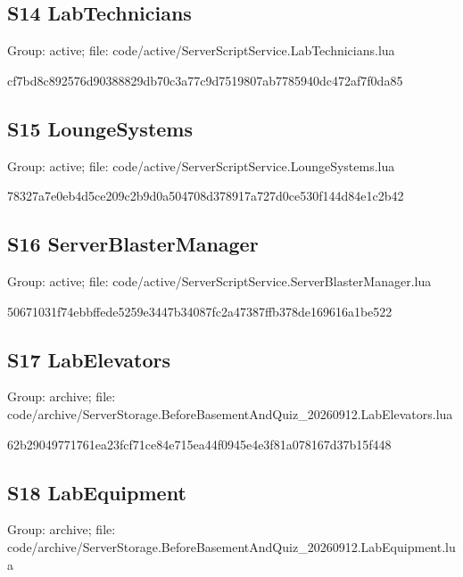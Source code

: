 \subsection{S14 LabTechnicians}
Group: active; file: code/\allowbreak{}active/\allowbreak{}ServerScriptService.\allowbreak{}LabTechnicians.\allowbreak{}lua

\begin{flushleft}\ttfamily\footnotesize cf7bd8c892576d90388829db70c3a77c9d7519807ab7785940dc472af7f0da85\end{flushleft}
\subsection{S15 LoungeSystems}
Group: active; file: code/\allowbreak{}active/\allowbreak{}ServerScriptService.\allowbreak{}LoungeSystems.\allowbreak{}lua

\begin{flushleft}\ttfamily\footnotesize 78327a7e0eb4d5ce209c2b9d0a504708d378917a727d0ce530f144d84e1c2b42\end{flushleft}
\subsection{S16 ServerBlasterManager}
Group: active; file: code/\allowbreak{}active/\allowbreak{}ServerScriptService.\allowbreak{}ServerBlasterManager.\allowbreak{}lua

\begin{flushleft}\ttfamily\footnotesize 50671031f74ebbffede5259e3447b34087fc2a47387ffb378de169616a1be522\end{flushleft}
\subsection{S17 LabElevators}
Group: archive; file: code/\allowbreak{}archive/\allowbreak{}ServerStorage.\allowbreak{}BeforeBasementAndQuiz\_\allowbreak{}20260912.\allowbreak{}LabElevators.\allowbreak{}lua

\begin{flushleft}\ttfamily\footnotesize 62b29049771761ea23fcf71ce84e715ea44f0945e4e3f81a078167d37b15f448\end{flushleft}
\subsection{S18 LabEquipment}
Group: archive; file: code/\allowbreak{}archive/\allowbreak{}ServerStorage.\allowbreak{}BeforeBasementAndQuiz\_\allowbreak{}20260912.\allowbreak{}LabEquipment.\allowbreak{}lua

